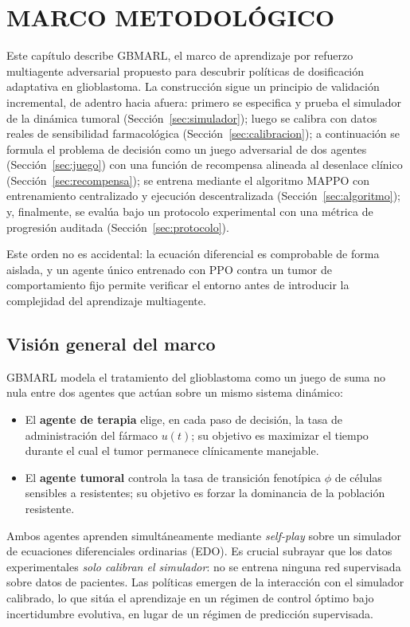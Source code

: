\chapter{MARCO METODOLÓGICO}
\label{cap:metodologia}

Este capítulo describe GBMARL, el marco de aprendizaje por refuerzo multiagente adversarial propuesto para descubrir políticas de dosificación adaptativa en glioblastoma. La construcción sigue un principio de validación incremental, de adentro hacia afuera: primero se especifica y prueba el simulador de la dinámica tumoral (Sección~\ref{sec:simulador}); luego se calibra con datos reales de sensibilidad farmacológica (Sección~\ref{sec:calibracion}); a continuación se formula el problema de decisión como un juego adversarial de dos agentes (Sección~\ref{sec:juego}) con una función de recompensa alineada al desenlace clínico (Sección~\ref{sec:recompensa}); se entrena mediante el algoritmo MAPPO con entrenamiento centralizado y ejecución descentralizada (Sección~\ref{sec:algoritmo}); y, finalmente, se evalúa bajo un protocolo experimental con una métrica de progresión auditada (Sección~\ref{sec:protocolo}).

Este orden no es accidental: la ecuación diferencial es comprobable de forma aislada, y un agente único entrenado con PPO contra un tumor de comportamiento fijo permite verificar el entorno antes de introducir la complejidad del aprendizaje multiagente.

\section{Visión general del marco}
\label{sec:vision-general}

GBMARL modela el tratamiento del glioblastoma como un juego de suma no nula entre dos agentes que actúan sobre un mismo sistema dinámico:

\begin{itemize}
  \item El \textbf{agente de terapia} elige, en cada paso de decisión, la tasa de administración del fármaco $u(t)$; su objetivo es maximizar el tiempo durante el cual el tumor permanece clínicamente manejable.
  \item El \textbf{agente tumoral} controla la tasa de transición fenotípica $\phi$ de células sensibles a resistentes; su objetivo es forzar la dominancia de la población resistente.
\end{itemize}

Ambos agentes aprenden simultáneamente mediante \emph{self-play} sobre un simulador de ecuaciones diferenciales ordinarias (EDO). Es crucial subrayar que los datos experimentales \emph{solo calibran el simulador}: no se entrena ninguna red supervisada sobre datos de pacientes. Las políticas emergen de la interacción con el simulador calibrado, lo que sitúa el aprendizaje en un régimen de control óptimo bajo incertidumbre evolutiva, en lugar de un régimen de predicción supervisada.

